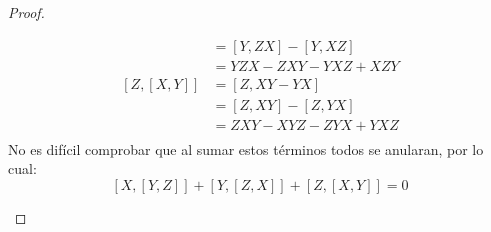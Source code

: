 \begin{proof}
\begin{enumerate}
\begin{align*}
			                & = [Y,ZX] - [Y,XZ]       \\
			                & = YZX - ZXY - YXZ + XZY \\
			      [Z,[X,Y]] & = [Z,XY- YX]            \\
			                & = [Z,XY] - [Z,YX]       \\
			                & = ZXY - XYZ - ZYX + YXZ \\
		      \end{align*}
		      No es difícil comprobar que al sumar estos términos todos se anularan, por lo cual:
		      \[
			      [X,[Y,Z]] + [Y,[Z,X]] + [Z,[X,Y]] = 0
		      \]
	\end{enumerate}
\end{proof}
